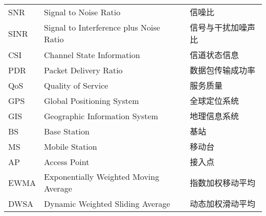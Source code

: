 \begin{supertabular}{lll}
SNR         & \hspace{0.5em}Signal to Noise Ratio                     & \hspace{0.5em}信噪比 \\
SINR        & \hspace{0.5em}Signal to Interference plus Noise Ratio   & \hspace{0.5em}信号与干扰加噪声比 \\
CSI         & \hspace{0.5em}Channel State Information                 & \hspace{0.5em}信道状态信息 \\
PDR         & \hspace{0.5em}Packet Delivery Ratio                     & \hspace{0.5em}数据包传输成功率 \\
QoS         & \hspace{0.5em}Quality of Service                        & \hspace{0.5em}服务质量 \\
GPS         & \hspace{0.5em}Global Positioning System                 & \hspace{0.5em}全球定位系统 \\
GIS         & \hspace{0.5em}Geographic Information System             & \hspace{0.5em}地理信息系统 \\
BS          & \hspace{0.5em}Base Station                              & \hspace{0.5em}基站 \\
MS          & \hspace{0.5em}Mobile Station                            & \hspace{0.5em}移动台 \\
AP          & \hspace{0.5em}Access Point                              & \hspace{0.5em}接入点 \\
EWMA        & \hspace{0.5em}Exponentially Weighted Moving Average     & \hspace{0.5em}指数加权移动平均 \\
DWSA        & \hspace{0.5em}Dynamic Weighted Sliding Average          & \hspace{0.5em}动态加权滑动平均 \\

\end{supertabular}
